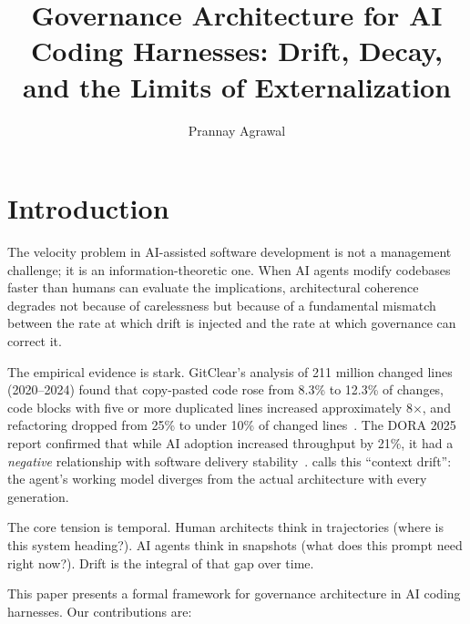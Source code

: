 \documentclass[11pt, a4paper, logo, copyright]{googledeepmind}
\title{Governance Architecture for AI Coding Harnesses: Drift, Decay, and the Limits of Externalization}
\author[1]{Prannay Agrawal}
\begin{document}
\maketitle

\section{Introduction}
\label{sec:intro}

The velocity problem in AI-assisted software development is not a management challenge; it is an information-theoretic one. When AI agents modify codebases faster than humans can evaluate the implications, architectural coherence degrades not because of carelessness but because of a fundamental mismatch between the rate at which drift is injected and the rate at which governance can correct it.

The empirical evidence is stark. GitClear's analysis of 211 million changed lines (2020--2024) found that copy-pasted code rose from 8.3\% to 12.3\% of changes, code blocks with five or more duplicated lines increased approximately 8$\times$, and refactoring dropped from 25\% to under 10\% of changed lines~\citep{gitclear2025}. The DORA 2025 report confirmed that while AI adoption increased throughput by 21\%, it had a \emph{negative} relationship with software delivery stability~\citep{dora2025}. \citet{sylvester2026} calls this ``context drift'': the agent's working model diverges from the actual architecture with every generation.

The core tension is temporal. Human architects think in trajectories (where is this system heading?). AI agents think in snapshots (what does this prompt need right now?). Drift is the integral of that gap over time.

This paper presents a formal framework for governance architecture in AI coding harnesses. Our contributions are:
\end{document}
